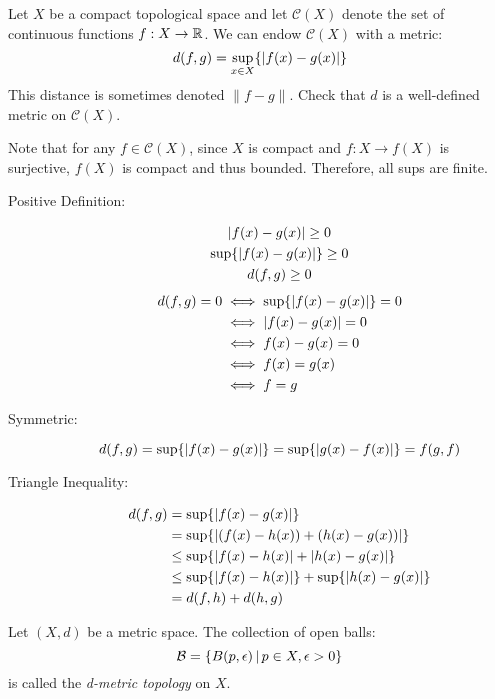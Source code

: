 \documentclass[letterpaper,12pt,fleqn]{article}
\newcommand{\norm}[1]{\left\lVert{#1}\right\rVert}
\newcommand{\B}{\mathcal{B}}
\renewcommand{\C}{\mathcal{C}}
\newcommand{\e}{\epsilon}
\begin{document}
\begin{example}
  Let \(X\) be a compact topological space and let \(\C(X)\) denote the set of continuous functions \(f:X\to\mathbb{R}\).  We
  can endow \(\C(X)\) with a metric:
  \[d(f,g)=\sup_{x\in X}\{\lvert f(x)-g(x)\rvert\}\]
  This distance is sometimes denoted \(\norm{f-g}\).  Check that \(d\) is a well-defined metric on \(\C(X)\).

  Note that for any \(f\in\C(X)\), since \(X\) is compact and \(f:X\to f(X)\) is surjective, \(f(X)\) is compact
  and thus bounded.  Therefore, all sups are finite.

  \begin{description}
  \item[Positive Definition:]
    \begin{gather*}
      \lvert f(x)-g(x)\rvert\ge0 \\
      \sup\{\lvert f(x)-g(x)\rvert\}\ge0 \\
      d(f,g)\ge0
    \end{gather*}
    \begin{align*}
      d(f,g)=0 &\iff \sup\{\lvert f(x)-g(x)\rvert\}=0 \\
      &\iff \lvert f(x)-g(x)\rvert=0 \\
      &\iff f(x)-g(x)=0 \\
      &\iff f(x)=g(x) \\
      &\iff f=g
    \end{align*}
  \item[Symmetric:]
    \[d(f,g)=\sup\{\lvert f(x)-g(x)\rvert\}=\sup\{\lvert g(x)-f(x)\rvert\}=f(g,f)\]
  \item[Triangle Inequality:]
    \begin{align*}
      d(f,g) &= \sup\{\lvert f(x)-g(x)\rvert\} \\
      &= \sup\{\lvert(f(x)-h(x))+(h(x)-g(x))\rvert\} \\
      &\le \sup\{\lvert f(x)-h(x)\rvert+\lvert h(x)-g(x)\rvert\} \\
      &\le \sup\{\lvert f(x)-h(x)\rvert\}+\sup\{\lvert h(x)-g(x)\rvert\} \\
      &= d(f,h)+d(h,g)
    \end{align*}
  \end{description}
\end{example}

\begin{definition}
  Let \((X,d)\) be a metric space.  The collection of open balls:
  \[\B=\setb{B(p,\e)}{p\in X, \e>0}\]
  is called the \emph{d-metric topology} on \(X\).
\end{definition}
\end{document}
